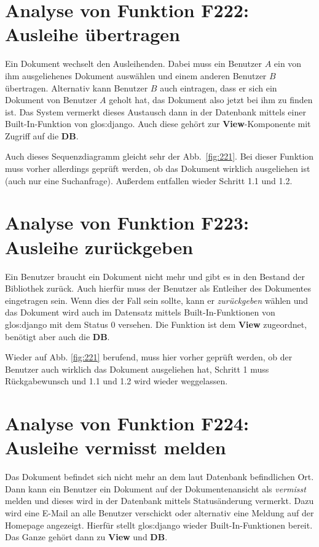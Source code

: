 \section{Analyse von Funktion F222: Ausleihe übertragen}
\label{f:222}
Ein Dokument wechselt den Ausleihenden. Dabei muss ein Benutzer $A$ ein von ihm ausgeliehenes Dokument auswählen und einem anderen Benutzer $B$ übertragen. Alternativ kann Benutzer $B$ auch eintragen, dass er sich ein Dokument von Benutzer $A$ geholt hat, das Dokument also jetzt bei ihm zu finden ist. Das System vermerkt dieses Austausch dann in der Datenbank mittels einer Built-In-Funktion von \gls{glos:django}. Auch diese gehört zur \textbf{View}-Komponente mit Zugriff auf die \textbf{DB}.

Auch dieses Sequenzdiagramm gleicht sehr der Abb.\ \ref{fig:221}. Bei dieser Funktion muss vorher allerdings geprüft werden, ob das Dokument wirklich ausgeliehen ist (auch nur eine Suchanfrage). Außerdem entfallen wieder Schritt 1.1 und 1.2.

\section{Analyse von Funktion F223: Ausleihe zurückgeben}
\label{f:223}
Ein Benutzer braucht ein Dokument nicht mehr und gibt es in den Bestand der Bibliothek zurück. Auch hierfür muss der Benutzer als Entleiher des Dokumentes eingetragen sein. Wenn dies der Fall sein sollte, kann er \emph{zurückgeben} wählen und das Dokument wird auch im Datensatz mittels Built-In-Funktionen von \gls{glos:django} mit dem Status 0 versehen. Die Funktion ist dem \textbf{View} zugeordnet, benötigt aber auch die \textbf{DB}.

Wieder auf Abb. \ref{fig:221} berufend, muss hier vorher geprüft werden, ob der Benutzer auch wirklich das Dokument ausgeliehen hat, Schritt 1 muss \glqq Rückgabewunsch \grqq und 1.1 und 1.2 wird wieder weggelassen.

\section{Analyse von Funktion F224: Ausleihe vermisst melden}
\label{f:224}
Das Dokument befindet sich nicht mehr an dem laut Datenbank befindlichen Ort. Dann kann ein Benutzer ein Dokument auf der Dokumentenansicht als \emph{vermisst} melden und dieses wird in der Datenbank mittels Statusänderung vermerkt. Dazu wird eine E-Mail an alle Benutzer verschickt oder alternativ eine Meldung auf der Homepage angezeigt. Hierfür stellt \gls{glos:django} wieder Built-In-Funktionen bereit. Das Ganze gehört dann zu \textbf{View} und \textbf{DB}.

